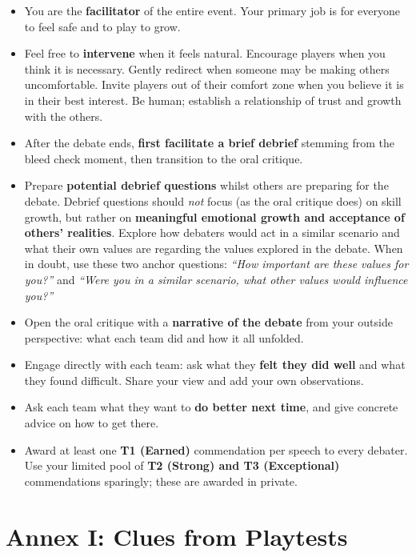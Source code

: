 \documentclass[12pt]{article}
\begin{document}
\begin{itemize}
    \item You are the \textbf{facilitator} of the entire event. Your primary job is for everyone to feel safe and to play to grow.
    \item Feel free to \textbf{intervene} when it feels natural. Encourage players when you think it is necessary. Gently redirect when someone may be making others uncomfortable. Invite players out of their comfort zone when you believe it is in their best interest. Be human; establish a relationship of trust and growth with the others.
    \item After the debate ends, \textbf{first facilitate a brief debrief} stemming from the bleed check moment, then transition to the oral critique.
    \item Prepare \textbf{potential debrief questions} whilst others are preparing for the debate. Debrief questions should \textit{not} focus (as the oral critique does) on skill growth, but rather on \textbf{meaningful emotional growth and acceptance of others' realities}. Explore how debaters would act in a similar scenario and what their own values are regarding the values explored in the debate. When in doubt, use these two anchor questions: \textit{``How important are these values for you?''} and \textit{``Were you in a similar scenario, what other values would influence you?''}
    \item Open the oral critique with a \textbf{narrative of the debate} from your outside perspective: what each team did and how it all unfolded.
    \item Engage directly with each team: ask what they \textbf{felt they did well} and what they found difficult. Share your view and add your own observations.
    \item Ask each team what they want to \textbf{do better next time}, and give concrete advice on how to get there.
    \item Award at least one \textbf{T1 (Earned)} commendation per speech to every debater. Use your limited pool of \textbf{T2 (Strong) and T3 (Exceptional)} commendations sparingly; these are awarded in private.
\end{itemize}

\newpage

\section*{Annex I: Clues from Playtests}
\end{document}
